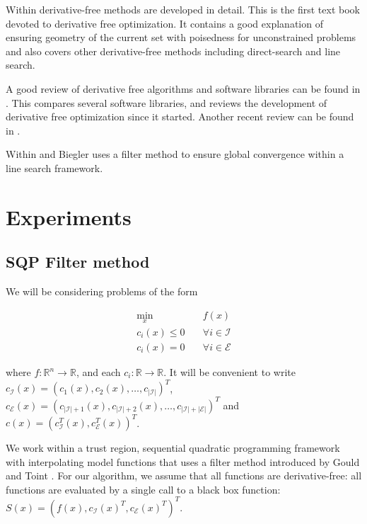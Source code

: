 \documentclass{article}
\begin{document}
Within  \cite{DUMMY:intro_book} derivative-free methods are developed in detail.
This is the first text book devoted to derivative free optimization.
It contains a good explanation of ensuring geometry of the current set with poisedness for unconstrained problems and also covers other derivative-free methods including direct-search and line search.

A good review of derivative free algorithms and software libraries can be found in \cite{DUMMY:review}.
This compares several software libraries, and reviews the development of derivative free optimization since it started.
Another recent review can be found in \cite{DUMMY:review2}.

Within \cite{DUMMY:linesearch_global} and \cite{DUMMY:linesearch_local} Biegler uses a filter method to ensure global convergence within a line search framework.

\section{Experiments}
\subsection{SQP Filter method}

We will be considering problems of the form


\begin{center}
\begin{align}
\label{problem}
\min_x & \quad f(x) \\
  c_i(x) \le 0   & \quad \forall i \in \mathcal {I} \nonumber \\
  c_i(x)  = 0    & \quad \forall i \in \mathcal {E} \nonumber
\end{align}
\end{center}
where $f : \mathbb R^n \to \mathbb R$, and each $c_i : \mathbb{R} \to \mathbb{R}$.
It will be convenient to write
$c_{\mathcal {I}}(x) = (c_1(x), c_2(x), \ldots, c_{|\mathcal{I}|})^T$,
$c_{\mathcal {E}}(x) = (c_{|\mathcal{I}|+1}(x), c_{|\mathcal{I}|+2}(x), \ldots, c_{|\mathcal{I}| + |\mathcal{E}|})^T$ and
$c(x) = (c_{\mathcal{I}}^T(x), c_{\mathcal{E}}^T(x))^T$.


We work within a trust region, sequential quadratic programming framework with interpolating model functions that uses a filter method introduced by Gould and Toint \cite{original_filter}.
For our algorithm, we assume that all functions are derivative-free: all functions are evaluated by a single call to a black box function:
$S(x) = (f(x), c_{\mathcal {I}}(x)^T, c_{\mathcal {E}}(x)^T)^T$.
\end{document}
